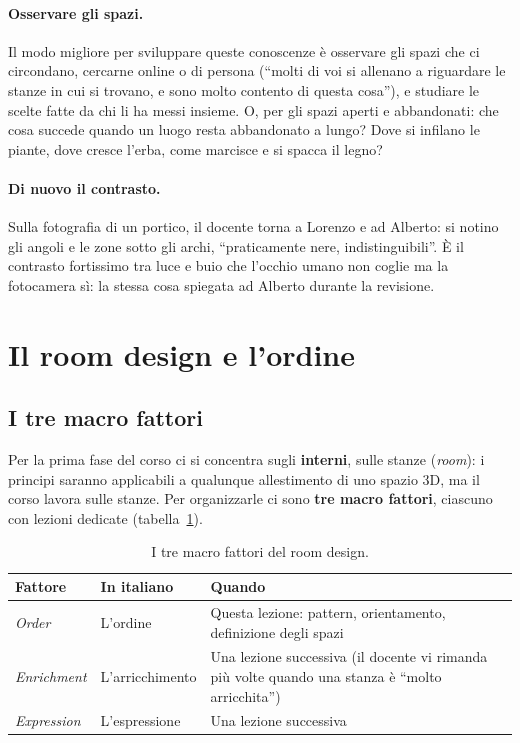 \paragraph{Osservare gli spazi.} Il modo migliore per sviluppare queste conoscenze è
osservare gli spazi che ci circondano, cercarne online o di persona (``molti di voi si
allenano a riguardare le stanze in cui si trovano, e sono molto contento di questa
cosa''), e studiare le scelte fatte da chi li ha messi insieme. O, per gli spazi aperti
e abbandonati: che cosa succede quando un luogo resta abbandonato a lungo? Dove si
infilano le piante, dove cresce l'erba, come marcisce e si spacca il legno?

\paragraph{Di nuovo il contrasto.} Sulla fotografia di un portico, il docente torna a
Lorenzo e ad Alberto: si notino gli angoli e le zone sotto gli archi, ``praticamente
nere, indistinguibili''. È il contrasto fortissimo tra luce e buio che l'occhio umano
non coglie ma la fotocamera sì: la stessa cosa spiegata ad Alberto durante la revisione.

\section{Il room design e l'ordine}
\label{gd17:sec:ordine}



\subsection{I tre macro fattori}

Per la prima fase del corso ci si concentra sugli \textbf{interni}, sulle stanze
(\emph{room}): i principi saranno applicabili a qualunque allestimento di uno spazio
3D, ma il corso lavora sulle stanze. Per organizzarle ci sono \textbf{tre macro
fattori}, ciascuno con lezioni dedicate (tabella~\ref{gd17:tab:macro}).

\begin{table}[ht]
\centering
\small
\begin{tabular}{@{}p{}p{}p{}@{}}
\toprule
\textbf{Fattore} & \textbf{In italiano} & \textbf{Quando} \\
\midrule
\emph{Order} & L'ordine & Questa lezione: pattern, orientamento, definizione degli
  spazi \\
\emph{Enrichment} & L'arricchimento & Una lezione successiva (il docente vi rimanda
  più volte quando una stanza è ``molto arricchita'') \\
\emph{Expression} & L'espressione & Una lezione successiva \\
\bottomrule
\end{tabular}
\caption{I tre macro fattori del room design.}
\label{gd17:tab:macro}
\end{table}

